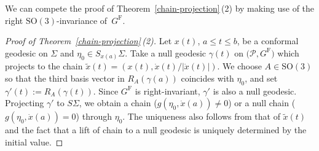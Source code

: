 We can compete the proof of Theorem~\ref{chain-projection}\,(2) by making use of the right $\mathrm{SO}(3)$-invariance of~$G^{\mathrm{F}}$.

\begin{proof}[Proof of Theorem~\ref{chain-projection}\,(2)]
Let $x(t)$, $a\le t\le b$, be a conformal geodesic on $\Sigma$ and $\eta_0\in S_{x(a)}\Sigma$. Take a null geodesic $\gamma(t)$ on $\bigl(\mathcal{P}, G^{\mathrm{F}}\bigr)$ which projects to the chain $\tilde x(t)=(x(t), \dot x(t)/|\dot x(t)|)$.
We choose $A\in \mathrm{SO}(3)$ so that the third basis vector in $R_A(\gamma(a))$ coincides with $\eta_0$, and set $\gamma'(t):=R_A(\gamma(t))$. Since $G^{\mathrm{F}}$ is right-invariant, $\gamma'$ is also a null geodesic. Projecting $\gamma'$ to $S\Sigma$, we obtain a chain ($g(\eta_0, \dot x(a))\neq0$) or a null chain
 ($g(\eta_0, \dot x(a))=0$) through $\eta_0$. The uniqueness also follows from that of $\tilde x(t)$ and the fact that a lift of chain to a null geodesic is uniquely determined by the initial value.
\end{proof}
